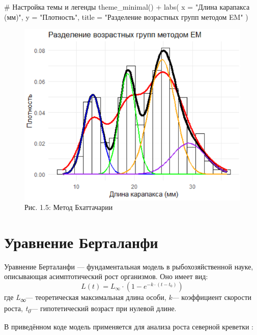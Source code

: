\documentclass[
  letterpaper,
  DIV=11,
  numbers=noendperiod]{scrreprt}
\newenvironment{Shaded}{\begin{snugshade}}{\end{snugshade}}
\newcommand{\AttributeTok}[1]{\textcolor[rgb]{0.40,0.45,0.13}{#1}}
\newcommand{\CommentTok}[1]{\textcolor[rgb]{0.37,0.37,0.37}{#1}}
\newcommand{\FunctionTok}[1]{\textcolor[rgb]{0.28,0.35,0.67}{#1}}
\newcommand{\NormalTok}[1]{\textcolor[rgb]{0.00,0.23,0.31}{#1}}
\newcommand{\SpecialCharTok}[1]{\textcolor[rgb]{0.37,0.37,0.37}{#1}}
\newcommand{\StringTok}[1]{\textcolor[rgb]{0.13,0.47,0.30}{#1}}
\begin{document}
\begin{Shaded}
\begin{Highlighting}[]
  \CommentTok{\# Настройка темы и легенды}
  \FunctionTok{theme\_minimal}\NormalTok{() }\SpecialCharTok{+}
  \FunctionTok{labs}\NormalTok{(}
    \AttributeTok{x =} \StringTok{"Длина карапакса (мм)"}\NormalTok{,}
    \AttributeTok{y =} \StringTok{"Плотность"}\NormalTok{,}
    \AttributeTok{title =} \StringTok{"Разделение возрастных групп методом EM"}
\NormalTok{  )}
\end{Highlighting}
\end{Shaded}

\begin{figure}[H]

{\centering \includegraphics[width=0.6\linewidth,height=\textheight,keepaspectratio]{images/bhattacharya_shrimp.PNG}

}

\caption{Рис. 1.5: Метод Бхаттачарии}

\end{figure}%

\section{Уравнение
Берталанфи}\label{ux443ux440ux430ux432ux43dux435ux43dux438ux435-ux431ux435ux440ux442ux430ux43bux430ux43dux444ux438}

Уравнение Берталанфи --- фундаментальная модель в рыбохозяйственной
науке, описывающая асимптотический рост организмов. Оно имеет вид: \[
L(t) = L_{\infty} \cdot \left(1 - e^{-k \cdot (t - t_0)}\right)
\] где \emph{L\textsubscript{∞}}--- теоретическая максимальная длина
особи, \emph{k}--- коэффициент скорости роста,
\emph{t\textsubscript{0}}--- гипотетический возраст при нулевой длине.

В приведённом коде модель применяется для анализа роста северной
креветки :
\end{document}
